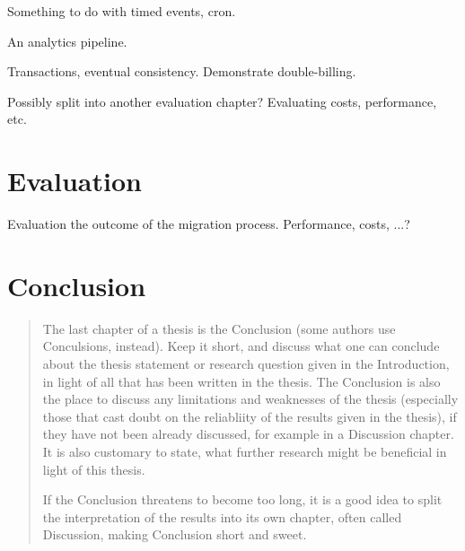 \documentclass[utf8,english]{gradu3}
\begin{document}
Something to do with timed events, cron.

An analytics pipeline.

Transactions, eventual consistency. Demonstrate double-billing.

Possibly split into another evaluation chapter? Evaluating costs, performance, etc.

\chapter{Evaluation}

Evaluation the outcome of the migration process. Performance, costs, ...?

\chapter{Conclusion}

\begin{quote}
The last chapter of a thesis is the Conclusion (some authors use
Conculsions, instead).  Keep it short, and discuss what one can
conclude about the thesis statement or research question given in the
Introduction, in light of all that has been written in the thesis.
The Conclusion is also the place to discuss any limitations and
weaknesses of the thesis (especially those that cast doubt on the
reliabliity of the results given in the thesis), if they have not been
already discussed, for example in a Discussion chapter.  It is also
customary to state, what further research might be beneficial in light
of this thesis.

If the Conclusion threatens to become too long, it is a good idea to
split the interpretation of the results into its own chapter, often
called Discussion, making Conclusion short and sweet.
\end{quote}

\printbibliography
\end{document}
